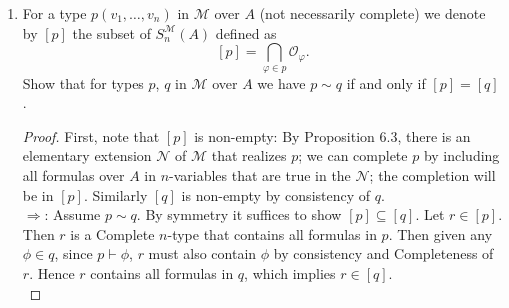 \documentclass{article}
\begin{document}
\begin{enumerate}[label={\bf Q\arabic*:}]
\begin{proof}
      Let $X\subseteq S^{\mathcal{M}}_n(A)$ be both open and closed. Since
      $X$ is open, $X=\cup_{i\in I}\mathcal{O}_{\varphi_i}$ for some set of
      formulas $\{\varphi_i\}_{i\in I}$. Similarly, since
      $S^{\mathcal{M}}_n(A)\setminus X$ is open, it is equals to
      $\cup_{j\in J}\mathcal{O}_{\phi_j}$ for some set of formulas
      $\{\phi_j\}_{j\in J}$. Then $\cup_{i\in
      I}\mathcal{O}_{\varphi_i}\cup\cup_{j\in J}\mathcal{O}_{\phi_j}$ is an
      open cover of $S^{\mathcal{M}}_n(A)$, so by compactness of
      $S^{\mathcal{M}}_n(A)$ as stated in Claim 6.12,
      $S^{\mathcal{M}}_n(A)$ is covered by some finite
      $\mathcal{O}_{\varphi_1},\ldots,\mathcal{O}_{\varphi_m}$ and
      $\mathcal{O}_{\phi_1},\ldots,\mathcal{O}_{\phi_n}$. Then
      $X=\cup_{i=1}^{m}\mathcal{O}_{\varphi_i}$, so it suffices to show
      that $\cup_{i=1}^{m}\mathcal{O}_{\varphi_i}=\mathcal{O}_{\varphi}$,
      where $\varphi$ is the disjunction of $\varphi_1,\ldots,\varphi_m$.
      $\subseteq$ holds because any type $p\in S^{\mathcal{M}}_n(A)$ that
      contains $\varphi_i$ must also contain $\varphi$ from Completeness
      and consistency of $p$. Similarly, $\supseteq$ holds because any type
      $p\in S^{\mathcal{M}}_n(A)$ that contains $\varphi$ must also
      contain $\varphi_i$ for some $i\in\{1,\ldots,m\}$ from Completeness
      and consistency of $p$. 
    \end{proof}

  \item For a type $p(v_1,\ldots,v_n)$ in $\mathcal{M}$ over $A$ (not
    necessarily complete) we denote by $[p]$ the subset of
    $S^{\mathcal{M}}_n(A)$ defined as \[[p]=\bigcap_{\varphi\in
    p}\mathcal{O}_{\varphi}.\] Show that for types $p$, $q$ in
    $\mathcal{M}$ over $A$ we have $p\sim q$ if and only if $[p]=[q]$.

    \begin{proof}
      First, note that $[p]$ is non-empty: By Proposition 6.3, there is an
      elementary extension $\mathcal{N}$ of $\mathcal{M}$ that realizes
      $p$; we can complete $p$ by including all formulas over $A$ in
      $n$-variables that are true in the $\mathcal{N}$; the completion will
      be in $[p]$. Similarly $[q]$ is non-empty by consistency of $q$. \\

      $\Rightarrow$: Assume $p\sim q$. By symmetry it suffices to show
      $[p]\subseteq[q]$. Let $r\in[p]$. Then $r$ is a Complete $n$-type
      that contains all formulas in $p$. Then given any $\phi\in q$, since
      $p\vdash\phi$, $r$ must also contain $\phi$ by consistency and
      Completeness of $r$. Hence $r$ contains all formulas in $q$, which
      implies $r\in[q]$. \\


\end{proof}
\end{enumerate}
\end{document}
